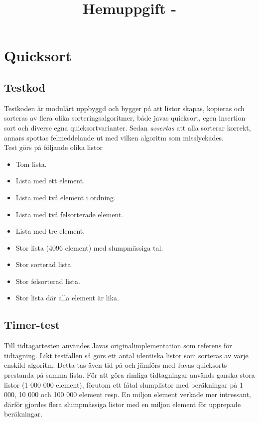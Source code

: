 \documentclass[a4paper,10pt,twoside]{article}
\title{Hemuppgift \assignmentNumber -  \courseName}
\date{\writtenDate}
\author{\myName}
\begin{document}
\maketitle %
	\thispagestyle{empty}\cfoot{}
\clearpage %
\thispagestyle{empty}\cfoot{}
\tableofcontents %
\clearpage
\setcounter{page}{1} %

\section{Quicksort} %
\subsection{Testkod}

Testkoden är modulärt uppbyggd och bygger på att listor skapas, kopieras och sorteras av flera olika sorteringsalgoritmer, både javas quicksort, egen insertion sort och diverse egna quicksortvarianter. Sedan \emph{assertas} att alla sorterar korrekt, annars spottas felmeddelande ut med vilken algoritm som misslyckades.\\

Test görs på följande olika listor

\begin{itemize}
\item Tom lista.
\item Lista med ett element.
\item Lista med två element i ordning.
\item Lista med två felsorterade element.
\item Lista med tre element.
\item Stor lista (4096 element) med slumpmässiga tal.
\item Stor sorterad lista.
\item Stor felsorterad lista.
\item Stor lista där alla element är lika.
\end{itemize}

\subsection{Timer-test}

Till tidtagartesten användes Javas originalimplementation som referens för tidtagning. Likt testfallen så görs ett antal identiska listor som sorteras av varje enskild algoritm. Detta tas även tid på och jämförs med Javas quicksorts prestanda på samma lista. För att göra rimliga tidtagningar används ganska stora listor (1 000 000 element), förutom ett fåtal slumplistor med beräkningar på 1 000, 10 000 och 100 000 element resp. En miljon element verkade mer intressant, därför gjordes flera slumpmässiga listor med en miljon element för upprepade beräkningar. \\
\end{document}
